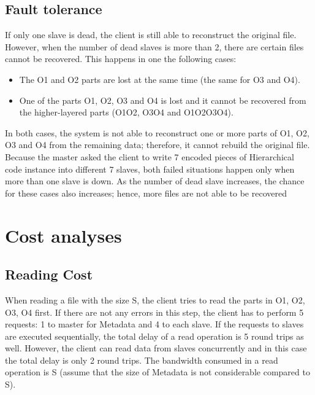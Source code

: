 \documentclass[conference]{IEEEtran}
\begin{document}
\subsection{Fault tolerance}
If only one slave is dead, the client is still able to reconstruct the original file. However, when the number of dead slaves is more than 2, there are certain files cannot be recovered. This happens in one the following cases:
\begin{itemize}
\item The O1 and O2 parts are lost at the same time (the same for O3 and O4).
\item	One of the parts O1, O2, O3 and O4 is lost and it cannot be recovered from the higher-layered parts (O1O2, O3O4 and O1O2O3O4).
\end{itemize}
In both cases, the system is not able to reconstruct one or more parts of O1, O2, O3 and O4 from the remaining data; therefore, it cannot rebuild the original file. Because the master asked the client to write 7 encoded pieces of Hierarchical code instance into different 7 slaves, both failed situations happen only when more than one slave is down. As the number of dead slave increases, the chance for these cases also increases; hence, more files are not able to be recovered

\section{Cost analyses}
\subsection{Reading Cost}
When reading a file with the size S, the client tries to read the parts in {O1, O2, O3, O4} first. If there are not any errors in this step, the client has to perform 5 requests: 1 to master for Metadata and 4 to each slave. If the requests to slaves are executed sequentially, the total delay of a read operation is 5 round trips as well. However, the client can read data from slaves concurrently and in this case the total delay is only 2 round trips. The bandwidth consumed in a read operation is S (assume that the size of Metadata is not considerable compared to S).
\end{document}
